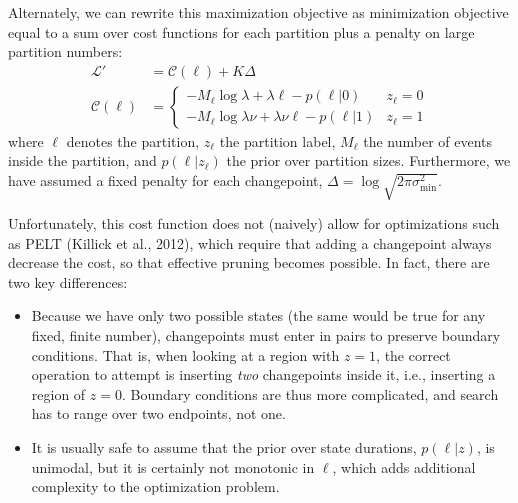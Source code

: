 \documentclass[11pt]{article}
\begin{document}
Alternately, we can rewrite this maximization objective as minimization objective equal to a sum over cost functions for each partition plus a penalty on large partition numbers:
\begin{align}
    \mathcal{L}' &= \mathcal{C}(\ell) + K \Delta \\
    \mathcal{C}(\ell) &=
    \begin{cases}
        -M_\ell \log \lambda + \lambda \ell - p(\ell|0) & z_\ell = 0 \\
        -M_\ell \log \lambda\nu + \lambda\nu \ell - p(\ell|1) & z_\ell = 1
    \end{cases}
\end{align}
where $\ell$ denotes the partition, $z_\ell$ the partition label, $M_\ell$ the number of events inside the partition, and $p(\ell|z_\ell)$ the prior over partition sizes. Furthermore, we have assumed a fixed penalty for each changepoint, $\Delta = \log \sqrt{2\pi \sigma^2_\mathrm{min}}$.

Unfortunately, this cost function does not (naively) allow for optimizations such as PELT (Killick et al., 2012), which require that adding a changepoint always decrease the cost, so that effective pruning becomes possible. In fact, there are two key differences:
\begin{itemize}
    \item Because we have only two possible states (the same would be true for any fixed, finite number), changepoints must enter in pairs to preserve boundary conditions. That is, when looking at a region with $z = 1$, the correct operation to attempt is inserting \emph{two} changepoints inside it, i.e., inserting a region of $z = 0$. Boundary conditions are thus more complicated, and search has to range over two endpoints, not one.

    \item It is usually safe to assume that the prior over state durations, $p(\ell|z)$, is unimodal, but it is certainly not monotonic in $\ell$, which adds additional complexity to the optimization problem.
\end{itemize}
\end{document}
